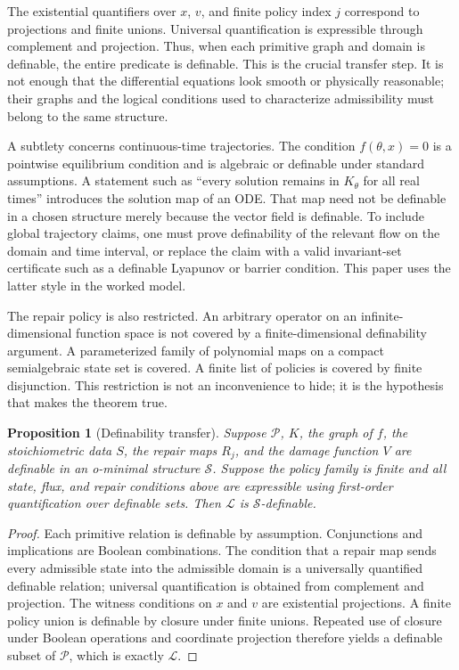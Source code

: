 \documentclass[11pt,a4paper]{article}
\newtheorem{proposition}[theorem]{Proposition}
\theoremstyle{definition}
\theoremstyle{remark}
\newcommand{\ThetaSet}{\mathcal{P}}
\newcommand{\Life}{\mathcal{L}}
\newcommand{\cS}{\mathcal{S}}
\begin{document}
The existential quantifiers over \(x\), \(v\), and finite policy index \(j\) correspond to projections and finite unions. Universal quantification is expressible through complement and projection. Thus, when each primitive graph and domain is definable, the entire predicate is definable. This is the crucial transfer step. It is not enough that the differential equations look smooth or physically reasonable; their graphs and the logical conditions used to characterize admissibility must belong to the same structure.

A subtlety concerns continuous-time trajectories. The condition \(f(\theta,x)=0\) is a pointwise equilibrium condition and is algebraic or definable under standard assumptions. A statement such as ``every solution remains in \(K_\theta\) for all real times'' introduces the solution map of an ODE. That map need not be definable in a chosen structure merely because the vector field is definable. To include global trajectory claims, one must prove definability of the relevant flow on the domain and time interval, or replace the claim with a valid invariant-set certificate such as a definable Lyapunov or barrier condition. This paper uses the latter style in the worked model.

The repair policy is also restricted. An arbitrary operator on an infinite-dimensional function space is not covered by a finite-dimensional definability argument. A parameterized family of polynomial maps on a compact semialgebraic state set is covered. A finite list of policies is covered by finite disjunction. This restriction is not an inconvenience to hide; it is the hypothesis that makes the theorem true.

\begin{proposition}[Definability transfer]
Suppose \(\ThetaSet\), \(K\), the graph of \(f\), the stoichiometric data \(S\), the repair maps \(R_j\), and the damage function \(V\) are definable in an o-minimal structure \(\cS\). Suppose the policy family is finite and all state, flux, and repair conditions above are expressible using first-order quantification over definable sets. Then \(\Life\) is \(\cS\)-definable.
\end{proposition}
\begin{proof}
Each primitive relation is definable by assumption. Conjunctions and implications are Boolean combinations. The condition that a repair map sends every admissible state into the admissible domain is a universally quantified definable relation; universal quantification is obtained from complement and projection. The witness conditions on \(x\) and \(v\) are existential projections. A finite policy union is definable by closure under finite unions. Repeated use of closure under Boolean operations and coordinate projection therefore yields a definable subset of \(\ThetaSet\), which is exactly \(\Life\).
\end{proof}
\end{document}
